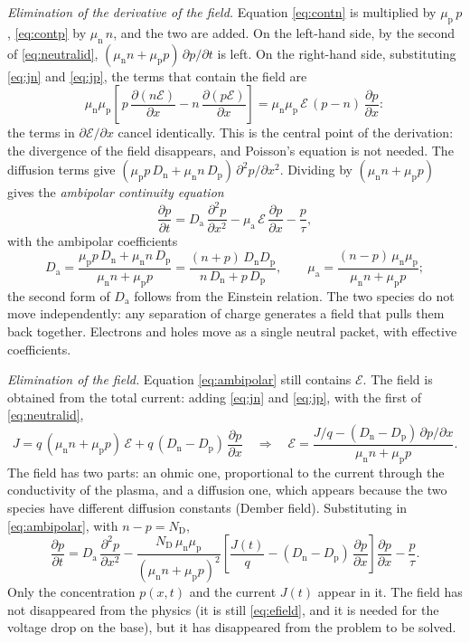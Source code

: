 \documentclass[10pt,a4paper]{scrartcl}
\newcommand{\Ef}{\mathcal{E}}                 %
\newcommand{\ND}{N_\mathrm{D}}
\newcommand{\Da}{D_\mathrm{a}}
\newcommand{\Dn}{D_\mathrm{n}}
\newcommand{\Dp}{D_\mathrm{p}}
\newcommand{\mun}{\mu_\mathrm{n}}
\newcommand{\mup}{\mu_\mathrm{p}}
\newcommand{\dpar}[2]{\frac{\partial #1}{\partial #2}}
\newcommand{\dparq}[2]{\frac{\partial^2 #1}{\partial #2^2}}
\begin{document}
\emph{Elimination of the derivative of the field.} Equation \eqref{eq:contn} is multiplied by $\mup\,p$, \eqref{eq:contp} by $\mun\,n$, and the two are added. On the left-hand side, by the second of \eqref{eq:neutralid}, $(\mun n + \mup p)\,\partial p/\partial t$ is left. On the right-hand side, substituting \eqref{eq:jn} and \eqref{eq:jp}, the terms that contain the field are
\begin{equation}
\mun\mup\left[\,p\,\dpar{(n\Ef)}{x} - n\,\dpar{(p\Ef)}{x}\right] = \mun\mup\,\Ef\,(p - n)\,\dpar{p}{x} :
\end{equation}
the terms in $\partial\Ef/\partial x$ cancel identically. This is the central point of the derivation: the divergence of the field disappears, and Poisson's equation is not needed. The diffusion terms give $(\mup p\,\Dn + \mun n\,\Dp)\,\partial^2 p/\partial x^2$. Dividing by $(\mun n + \mup p)$ gives the \emph{ambipolar continuity equation}
\begin{equation}
\dpar{p}{t} = \Da\,\dparq{p}{x} - \mu_\mathrm{a}\,\Ef\,\dpar{p}{x} - \frac{p}{\tau} ,
\label{eq:ambipolar}
\end{equation}
with the ambipolar coefficients
\begin{equation}
\Da = \frac{\mup p\,\Dn + \mun n\,\Dp}{\mun n + \mup p} = \frac{(n+p)\,\Dn\Dp}{n\,\Dn + p\,\Dp} , \qquad
\mu_\mathrm{a} = \frac{(n-p)\,\mun\mup}{\mun n + \mup p} ;
\label{eq:dacoef}
\end{equation}
the second form of $\Da$ follows from the Einstein relation. The two species do not move independently: any separation of charge generates a field that pulls them back together. Electrons and holes move as a single neutral packet, with effective coefficients.

\emph{Elimination of the field.} Equation \eqref{eq:ambipolar} still contains $\Ef$. The field is obtained from the total current: adding \eqref{eq:jn} and \eqref{eq:jp}, with the first of \eqref{eq:neutralid},
\begin{equation}
J = q\,(\mun n + \mup p)\,\Ef + q\,(\Dn - \Dp)\,\dpar{p}{x}
\quad\Longrightarrow\quad
\Ef = \frac{J/q - (\Dn - \Dp)\,\partial p/\partial x}{\mun n + \mup p} .
\label{eq:efield}
\end{equation}
The field has two parts: an ohmic one, proportional to the current through the conductivity of the plasma, and a diffusion one, which appears because the two species have different diffusion constants (Dember field). Substituting in \eqref{eq:ambipolar}, with $n - p = \ND$,
\begin{equation}
\dpar{p}{t} = \Da\,\dparq{p}{x}
- \frac{\ND\,\mun\mup}{(\mun n + \mup p)^2}\left[\frac{J(t)}{q} - (\Dn - \Dp)\,\dpar{p}{x}\right]\dpar{p}{x}
- \frac{p}{\tau} .
\label{eq:ambipolarj}
\end{equation}
Only the concentration $p(x,t)$ and the current $J(t)$ appear in it. The field has not disappeared from the physics (it is still \eqref{eq:efield}, and it is needed for the voltage drop on the base), but it has disappeared from the problem to be solved.
\end{document}
